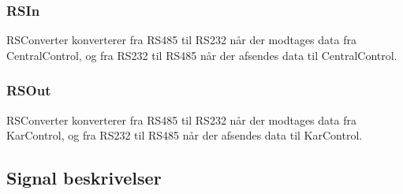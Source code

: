 
\subsubsection{RSIn}
RSConverter konverterer fra RS485 til RS232 når der modtages data fra CentralControl, og fra RS232 til RS485 når der afsendes data til CentralControl.

\subsubsection{RSOut}
RSConverter konverterer fra RS485 til RS232 når der modtages data fra KarControl, og fra RS232 til RS485 når der afsendes data til KarControl.

\subsection{Signal beskrivelser}

